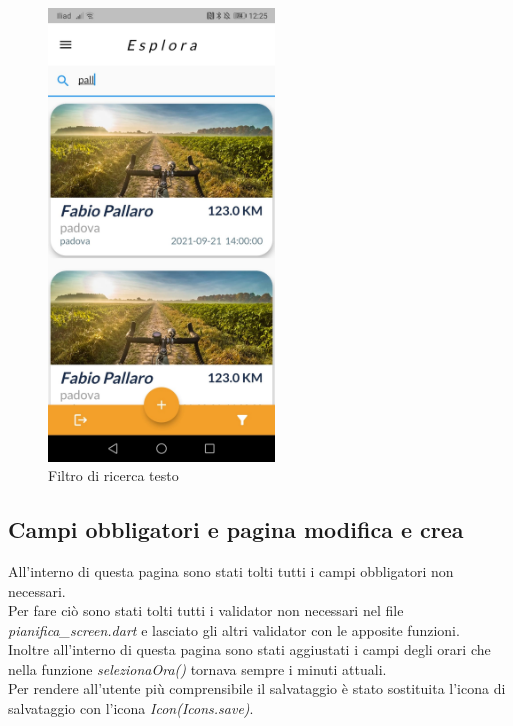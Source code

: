 \begin{figure}[htbp]	
	\centering
	\includegraphics[width=6cm]{immagini/filtrotesto.jpeg}
	\caption{Filtro di ricerca testo}
	\label{fig:Filtro di ricerca testo}
\end{figure}

\newpage

\subsection{Campi obbligatori e pagina modifica e crea}
All'interno di questa pagina sono stati tolti tutti i campi obbligatori non necessari.\\
Per fare ciò sono stati tolti tutti i validator non necessari nel file \textit{pianifica\_screen.dart} e lasciato gli altri validator con le apposite funzioni.\\
Inoltre all'interno di questa pagina sono stati aggiustati i campi degli orari che nella funzione \textit{selezionaOra()} tornava sempre i minuti attuali.\\
Per rendere all'utente più comprensibile il salvataggio è stato sostituita l'icona di salvataggio con l'icona \textit{Icon(Icons.save)}.\\

